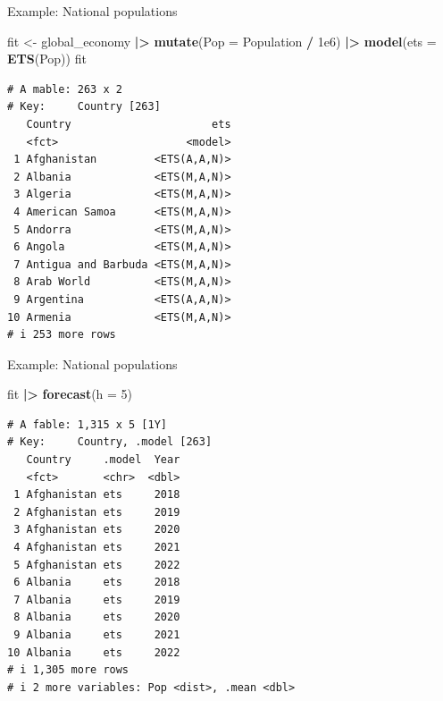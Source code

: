 \documentclass[
  14pt,
  ignorenonframetext,
  aspectratio=169,
]{beamer}
\newenvironment{Shaded}{\begin{snugshade}}{\end{snugshade}}
\newcommand{\AttributeTok}[1]{\textcolor[rgb]{0.13,0.29,0.53}{#1}}
\newcommand{\DecValTok}[1]{\textcolor[rgb]{0.00,0.00,0.81}{#1}}
\newcommand{\FloatTok}[1]{\textcolor[rgb]{0.00,0.00,0.81}{#1}}
\newcommand{\FunctionTok}[1]{\textcolor[rgb]{0.13,0.29,0.53}{\textbf{#1}}}
\newcommand{\NormalTok}[1]{#1}
\newcommand{\OtherTok}[1]{\textcolor[rgb]{0.56,0.35,0.01}{#1}}
\newcommand{\SpecialCharTok}[1]{\textcolor[rgb]{0.81,0.36,0.00}{\textbf{#1}}}
\renewenvironment{Shaded}{\vspace*{0.15cm}\color{black}\fontsize{10}{10}\sf\begin{snugshade}\color{black}}{\end{snugshade}}
\begin{document}
\begin{frame}[fragile]{Example: National populations}
\protect{}\label{example-national-populations}
\fontsize{9}{9}\sf

\begin{Shaded}
\begin{Highlighting}[]
\NormalTok{fit }\OtherTok{\textless{}{-}}\NormalTok{ global\_economy }\SpecialCharTok{|\textgreater{}}
  \FunctionTok{mutate}\NormalTok{(}\AttributeTok{Pop =}\NormalTok{ Population }\SpecialCharTok{/} \FloatTok{1e6}\NormalTok{) }\SpecialCharTok{|\textgreater{}}
  \FunctionTok{model}\NormalTok{(}\AttributeTok{ets =} \FunctionTok{ETS}\NormalTok{(Pop))}
\NormalTok{fit}
\end{Highlighting}
\end{Shaded}

\begin{verbatim}
# A mable: 263 x 2
# Key:     Country [263]
   Country                      ets
   <fct>                    <model>
 1 Afghanistan         <ETS(A,A,N)>
 2 Albania             <ETS(M,A,N)>
 3 Algeria             <ETS(M,A,N)>
 4 American Samoa      <ETS(M,A,N)>
 5 Andorra             <ETS(M,A,N)>
 6 Angola              <ETS(M,A,N)>
 7 Antigua and Barbuda <ETS(M,A,N)>
 8 Arab World          <ETS(M,A,N)>
 9 Argentina           <ETS(A,A,N)>
10 Armenia             <ETS(M,A,N)>
# i 253 more rows
\end{verbatim}
\end{frame}

\begin{frame}[fragile]{Example: National populations}
\protect{}\label{example-national-populations-1}
\fontsize{9}{9}\sf

\begin{Shaded}
\begin{Highlighting}[]
\NormalTok{fit }\SpecialCharTok{|\textgreater{}}
  \FunctionTok{forecast}\NormalTok{(}\AttributeTok{h =} \DecValTok{5}\NormalTok{)}
\end{Highlighting}
\end{Shaded}

\begin{verbatim}
# A fable: 1,315 x 5 [1Y]
# Key:     Country, .model [263]
   Country     .model  Year
   <fct>       <chr>  <dbl>
 1 Afghanistan ets     2018
 2 Afghanistan ets     2019
 3 Afghanistan ets     2020
 4 Afghanistan ets     2021
 5 Afghanistan ets     2022
 6 Albania     ets     2018
 7 Albania     ets     2019
 8 Albania     ets     2020
 9 Albania     ets     2021
10 Albania     ets     2022
# i 1,305 more rows
# i 2 more variables: Pop <dist>, .mean <dbl>
\end{verbatim}
\end{frame}
\end{document}
